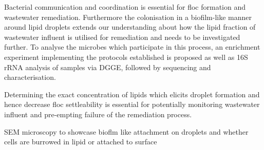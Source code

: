 \documentclass[11pt]{article}
\begin{document}
Bacterial communication and coordination is essential for floc formation and wastewater remediation. Furthermore the colonisation in a biofilm-like manner around lipid droplets extends our understanding about how the lipid fraction of wastewater influent is utilised for remediation and needs to be investigated further. To analyse the microbes which participate in this process, an enrichment experiment implementing the protocols established is proposed as well as 16S rRNA analysis of samples via DGGE, followed by sequencing and characterisation. 

Determining the exact concentration of lipids which elicits droplet formation and hence decrease floc settleability is essential for potentially monitoring wastewater influent and pre-empting failure of the remediation process. 

SEM microscopy to showcase bioflm like attachment on droplets and whether cells are burrowed in lipid or attached to surface
\end{document}
